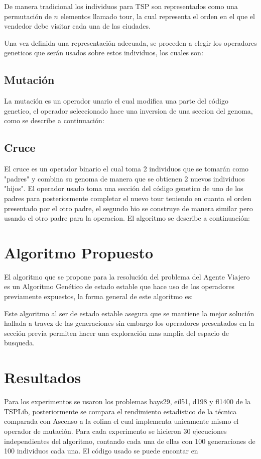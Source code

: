 \documentclass[twocolumn]{IEEEtran}
\begin{document}
De manera tradicional los individuos para TSP son representados como una permutación de $n$
elementos llamado tour, la cual representa el orden en el que el vendedor debe visitar
cada una de las ciudades.

Una vez definida una representación adecuada, se proceden a elegir los operadores geneticos que
serán usados sobre estos individuos, los cuales son:

\subsection{Mutación}
La mutación es un operador unario el cual modifica una parte del código genetico, el operador
seleccionado hace una inversion de una seccion del genoma, como se describe a continuación:


\subsection{Cruce}
El cruce es un operador binario el cual toma 2 individuos que se tomarán como "padres" y combina su
genoma de manera que se obtienen 2 nuevos individuos "hijos". El operador usado toma una sección del
código genetico de uno de los padres para posteriormente completar el nuevo tour teniendo en cuanta
el orden presentado por el otro padre, el segundo hio se construye de manera similar pero usando el 
otro padre para la operacion. El algoritmo se describe a continuación:

\section{Algoritmo Propuesto}
El algoritmo que se propone para la resolución del problema del Agente Viajero es un Algoritmo
Genético de estado estable que hace uso de los operadores previamente expuestos,
la forma general de este algoritmo es:



Este algoritmo al ser de estado estable asegura que se mantiene la mejor solución hallada a travez
de las generaciones sin embargo los operadores presentados en la sección previa permiten hacer una
exploración mas amplia del espacio de busqueda.

\section{Resultados}

Para los experimentos se usaron los problemas bays29, eil51, d198 y fl1400 de la TSPLib,
posteriormente se compara el rendimiento estadistico de la técnica comparada con Ascenso a 
la colina el cual implementa unicamente mismo el operador de mutación.
Para cada experimento se hicieron 30 ejecuciones independientes del algoritmo, 
contando cada una de ellas con 100 generaciones de 100 individuos cada una.
El código usado se puede encontar en
\end{document}
